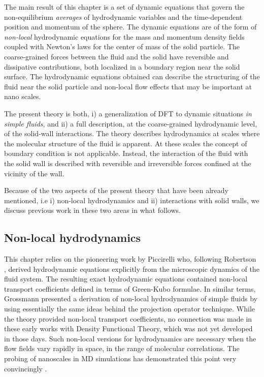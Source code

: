 \documentclass[b5paper,openright,11pt]{book}
\begin{document}
The main result of this chapter is a set of dynamic equations that
govern the non-equilibrium \textit{averages} of hydrodynamic variables
and  the time-dependent  position  and momentum  of  the sphere.   The
dynamic equations  are of the form  of \textit{non-local} hydrodynamic
equations  for  the mass  and  momentum  density fields  coupled  with
Newton's  laws for  the center  of mass  of the  solid particle.   The
coarse-grained forces between the fluid  and the solid have reversible
and  dissipative contributions,  both localized  in a  boundary region
near  the  solid surface.   The  hydrodynamic  equations obtained  can
describe  the structuring  of the  fluid near  the solid  particle and
non-local flow effects that may be important at nano scales.

The  present  theory  is   both,  i)  a
generalization  of DFT  to dynamic  situations
\textit{in simple  fluids},
and ii) a full description,  at the coarse-grained hydrodynamic level,
of the solid-wall interactions.  The theory describes hydrodynamics at
scales  where the  molecular structure  of the  fluid is  apparent. At
these   scales   the   concept    of   boundary   condition   is   not
applicable. Instead, the interaction of  the fluid with the solid wall
is described with  reversible and irreversible forces  confined at the
vicinity of the wall.

Because  of the  two  aspects of  the present  theory  that have  been
already mentioned, i.e i) non-local hydrodynamics and ii) interactions
with solid walls, we discuss previous  work in these two areas in what
follows.

\subsection{Non-local hydrodynamics}
This   chapter    relies   on   the   pioneering    work   by   Piccirelli
\cite{Piccirelli1968}  who, following  Robertson \cite{Robertson1966},
derived  hydrodynamic   equations  explicitly  from   the  microscopic
dynamics  of  the fluid  system.   The  resulting   exact  hydrodynamic  equations
contained  non-local  transport  coefficients   defined  in  terms  of
Green-Kubo formulae.  In  similar terms, Grossmann \cite{Grossmann1970}
presented a derivation of non-local  hydrodynamics of simple fluids by
using  essentially  the  same  ideas behind  the  projection  operator
technique.    While   the    theory   provided   non-local   transport
coefficients, no connection was made in these early works with Density
Functional Theory,  which was not  yet developed in those  days.  Such
non-local  versions  for hydrodynamics  are  necessary  when the  flow
fields vary rapidly in space,  in the range of molecular correlations.
The  probing of  nanoscales in  MD simulations  has demonstrated  this
point                         very                        convincingly
\cite{Zhang2004,Hansen2007,Todd2008a,Hansen2011}.
\end{document}
